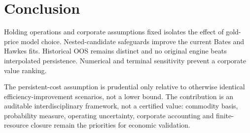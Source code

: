 \section*{Conclusion}

Holding operations and corporate assumptions fixed isolates the effect of gold-price model choice. Nested-candidate safeguards improve the current Bates and Hawkes fits. Historical OOS remains distinct and no original engine beats interpolated persistence. Numerical and terminal sensitivity prevent a corporate value ranking.

The persistent-cost assumption is prudential only relative to otherwise identical efficiency-improvement scenarios, not a lower bound. The contribution is an auditable interdisciplinary framework, not a certified value: commodity basis, probability measure, operating uncertainty, corporate accounting and finite-resource closure remain the priorities for economic validation.
